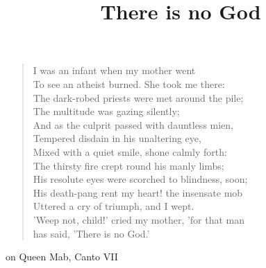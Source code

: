 \documentclass[12pt]{article}
\title{There is no God}
\begin{document}
\begin{verse}
  I was an infant when my mother went \\
  To see an atheist burned. She took me there: \\
  The dark-robed priests were met around the pile; \\
  The multitude was gazing silently; \\
  And as the culprit passed with dauntless mien, \\
  Tempered disdain in his unaltering eye, \\
  Mixed with a quiet smile, shone calmly forth: \\
  The thirsty fire crept round his manly limbs; \\
  His resolute eyes were scorched to blindness, soon; \\
  His death-pang rent my heart! the insensate mob \\
  Uttered a cry of triumph, and I wept. \\
  'Weep not, child!' cried my mother, 'for that man \\
  has said, 'There is no God.' \\
\end{verse}

on Queen Mab, Canto VII \nocite{shelley2002shelley}
\end{document}
